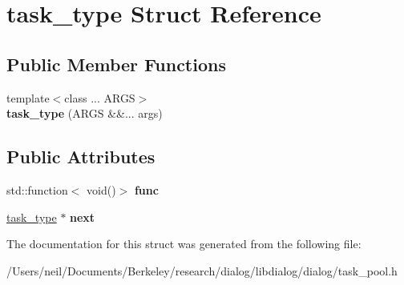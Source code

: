 \hypertarget{structtask__type}{}\section{task\+\_\+type Struct Reference}
\label{structtask__type}
\subsection*{Public Member Functions}
\begin{DoxyCompactItemize}
\item 
\mbox{\label{structtask__type_a33487635fa4dbfbf3c0fcfd6a190db6e}} 
{\footnotesize template$<$class ... A\+R\+GS$>$ }\\{\bfseries task\+\_\+type} (A\+R\+GS \&\&... args)
\end{DoxyCompactItemize}
\subsection*{Public Attributes}
\begin{DoxyCompactItemize}
\item 
\mbox{\label{structtask__type_a3469a51c6a78e7fc71803f154d79c3de}} 
std\+::function$<$ void()$>$ {\bfseries func}
\item 
\mbox{\label{structtask__type_a09cf233855db062772a4ec60839306c5}} 
\hyperlink{structtask__type}{task\+\_\+type} $\ast$ {\bfseries next}
\end{DoxyCompactItemize}


The documentation for this struct was generated from the following file\+:\begin{DoxyCompactItemize}
\item 
/\+Users/neil/\+Documents/\+Berkeley/research/dialog/libdialog/dialog/task\+\_\+pool.\+h\end{DoxyCompactItemize}
